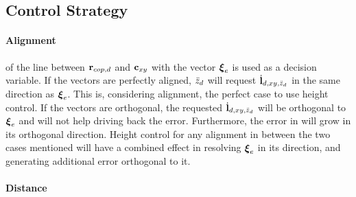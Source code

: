 \subsection{Control Strategy}\label{sec:strategy}


%
\paragraph{Alignment} of the line between $\mathbf{r}_{cop,d}$ and $\mathbf{c}_{xy}$ with the vector $\boldsymbol{\xi}_e$ is used as a decision variable. If the vectors are perfectly aligned, $\ddot{z}_d$ will request $\dot{\mathbf{l}}_{d,xy,\ddot{z}_d}$ in the same direction as $\boldsymbol{\xi}_e$. This is, considering alignment, the perfect case to use height control. If the vectors are orthogonal, the requested $\dot{\mathbf{l}}_{d,xy,\ddot{z}_d}$ will be orthogonal to $\boldsymbol{\xi}_e$ and will not help driving back the error. Furthermore, the error in will grow in its orthogonal direction. Height control for any alignment in between the two cases mentioned will have a combined effect in resolving $\boldsymbol{\xi}_e$ in its direction, and generating additional error orthogonal to it.

\paragraph{Distance}


